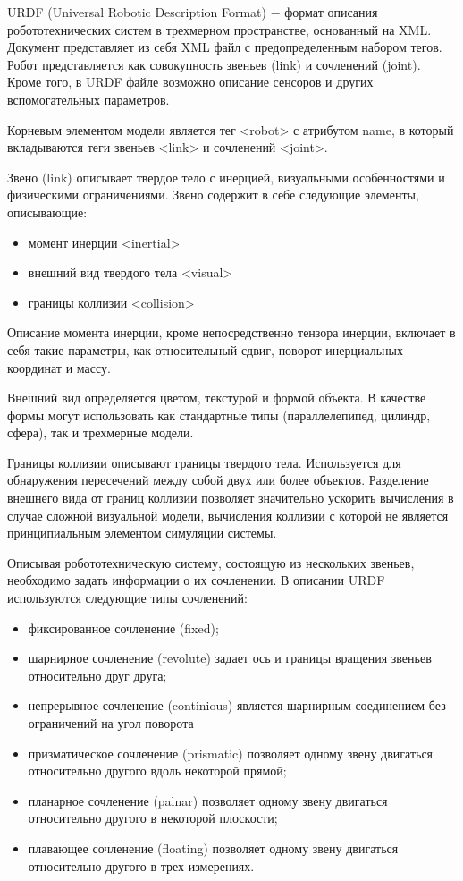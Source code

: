 \documentclass[oneside,final,14pt]{extreport}
\begin{document}
URDF (Universal Robotic Description Format) $-$ формат описания робототехнических систем в трехмерном пространстве, основанный на XML. Документ представляет из себя XML файл с предопределенным набором тегов. Робот представляется как совокупность звеньев (link) и сочленений (joint). Кроме того, в URDF файле возможно описание сенсоров и других вспомогательных параметров. 

Корневым элементом модели является тег <robot> с атрибутом name, в который вкладываются теги звеньев <link> и сочленений <joint>.

Звено (link) описывает твердое тело с инерцией, визуальными особенностями и физическими ограничениями. Звено содержит в себе следующие элементы, описывающие:

\begin{itemize}
\item момент инерции <inertial>
\item внешний вид твердого тела <visual>
\item границы коллизии <collision>
\end{itemize}

Описание момента инерции, кроме непосредственно тензора инерции, включает в себя такие параметры, как относительный сдвиг, поворот инерциальных координат и массу.

Внешний вид определяется цветом, текстурой и формой объекта. В качестве формы могут использовать как стандартные типы (параллелепипед, цилиндр, сфера), так и трехмерные модели. 

Границы коллизии описывают границы твердого тела. Используется для обнаружения пересечений между собой двух или более объектов. Разделение внешнего вида от границ коллизии позволяет значительно ускорить вычисления в случае сложной визуальной модели, вычисления коллизии с которой не является принципиальным элементом симуляции системы. 

Описывая робототехническую систему, состоящую из нескольких звеньев, необходимо задать информации о их сочленении. В описании URDF используются следующие типы сочленений:
\begin{itemize}
\item фиксированное сочленение (fixed);
\item шарнирное сочленение (revolute) задает ось и границы вращения звеньев относительно друг друга;
\item непрерывное сочленение  (continious) является шарнирным соединением без ограничений на угол поворота
\item призматическое сочленение (prismatic) позволяет одному звену двигаться относительно другого вдоль некоторой прямой;
\item планарное сочленение (palnar) позволяет одному звену двигаться относительно другого в некоторой плоскости;
\item плавающее сочленение (floating) позволяет одному звену двигаться относительно другого в трех измерениях.
\end{itemize} 
\end{document}
